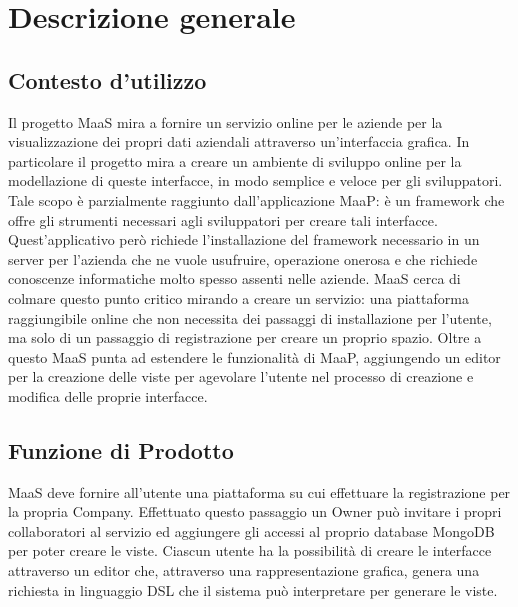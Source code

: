 \section{Descrizione generale}
\subsection{Contesto d'utilizzo}
Il progetto MaaS mira a fornire un servizio online per le aziende per la visualizzazione dei propri dati aziendali attraverso un'interfaccia grafica. In particolare il progetto mira a creare un ambiente di sviluppo online per la modellazione di queste interfacce, in modo semplice e veloce per gli sviluppatori.
Tale scopo è parzialmente raggiunto dall'applicazione MaaP: è un framework che offre gli strumenti necessari agli sviluppatori per creare tali interfacce. Quest'applicativo per\`o richiede l'installazione del framework necessario in un server per l'azienda che ne vuole usufruire, operazione onerosa e che richiede conoscenze informatiche molto spesso assenti nelle aziende. MaaS cerca di colmare questo punto critico mirando a creare un servizio: una piattaforma raggiungibile online che non necessita dei passaggi di installazione per l'utente, ma solo di un passaggio di registrazione per creare un proprio spazio.
Oltre a questo MaaS punta ad estendere le funzionalità di MaaP, aggiungendo un editor per la creazione delle viste per agevolare l'utente nel processo di creazione e modifica delle proprie interfacce.


\subsection{Funzione di Prodotto}
MaaS deve fornire all'utente una piattaforma su cui effettuare la registrazione per la propria Company. Effettuato questo passaggio un Owner pu\`o invitare i propri collaboratori al servizio ed aggiungere gli accessi al proprio database MongoDB per poter creare le viste.
Ciascun utente ha la possibilit\`a di creare le interfacce attraverso un editor che, attraverso una rappresentazione grafica, genera una richiesta in linguaggio DSL che il sistema può interpretare per generare le viste.

